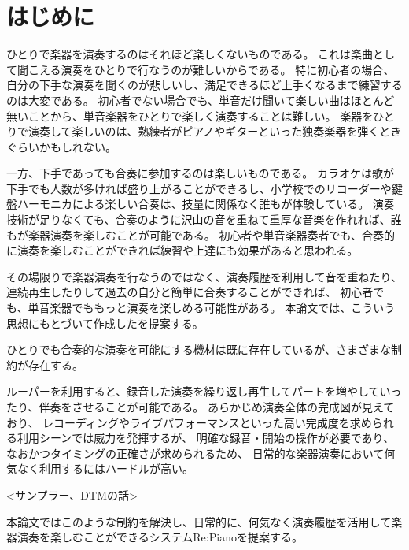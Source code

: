 \section{はじめに}
\label{sec:start}

ひとりで楽器を演奏するのはそれほど楽しくないものである。
これは楽曲として聞こえる演奏をひとりで行なうのが難しいからである。
特に初心者の場合、 自分の下手な演奏を聞くのが悲しいし、満足できるほど上手くなるまで練習するのは大変である。
初心者でない場合でも、単音だけ聞いて楽しい曲はほとんど無いことから、単音楽器をひとりで楽しく演奏することは難しい。
楽器をひとりで演奏して楽しいのは、熟練者がピアノやギターといった独奏楽器を弾くときぐらいかもしれない。

一方、下手であっても合奏に参加するのは楽しいものである。
カラオケは歌が下手でも人数が多ければ盛り上がることができるし、小学校でのリコーダーや鍵盤ハーモニカによる楽しい合奏は、技量に関係なく誰もが体験している。
演奏技術が足りなくても、合奏のように沢山の音を重ねて重厚な音楽を作れれば、誰もが楽器演奏を楽しむことが可能である。
初心者や単音楽器奏者でも、合奏的に演奏を楽しむことができれば練習や上達にも効果があると思われる。

その場限りで楽器演奏を行なうのではなく、演奏履歴を利用して音を重ねたり、連続再生したりして過去の自分と簡単に合奏することができれば、
初心者でも、単音楽器でももっと演奏を楽しめる可能性がある。
本論文では、こういう思想にもとづいて作成した{\system}を提案する。


ひとりでも合奏的な演奏を可能にする機材は既に存在しているが、さまざまな制約が存在する。

ルーパーを利用すると、録音した演奏を繰り返し再生してパートを増やしていったり、伴奏をさせることが可能である。
あらかじめ演奏全体の完成図が見えており、
レコーディングやライブパフォーマンスといった高い完成度を求められる利用シーンでは威力を発揮するが、
明確な録音・開始の操作が必要であり、なおかつタイミングの正確さが求められるため、
日常的な楽器演奏において何気なく利用するにはハードルが高い。

<サンプラー、DTMの話>

本論文ではこのような制約を解決し、日常的に、何気なく演奏履歴を活用して楽器演奏を楽しむことができるシステムRe:Pianoを提案する。

%

